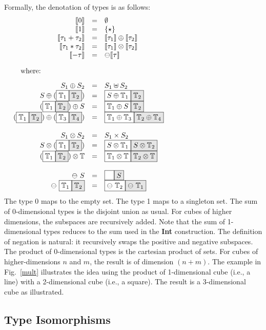 \documentclass[authoryear,preprint]{sigplanconf}
\newcommand{\cubt}{\mathbb{T}}
\newcommand{\den}[1]{\llbracket #1 \rrbracket}
\newcommand{\nodet}[2]{\fcolorbox{black}{white}{$#1$}\fcolorbox{black}{gray!20}{$#2$}}
\begin{document}
Formally, the denotation of types is as follows:
\[\begin{array}{rcl}
\den{0} &=& \emptyset \\
\den{1} &=& \{ \star \} \\
\den{\tau_1 + \tau_2} &=& \den{\tau_1} \oplus \den{\tau_2} \\
\den{\tau_1 * \tau_2} &=& \den{\tau_1} \otimes \den{\tau_2} \\
\den{- \tau} &=& \ominus \den{\tau} \\
\\
\noalign{\mbox{where:}\hfill}
\\
S_1 \oplus S_2 &=& S_1 \uplus S_2 \\
S \oplus (\nodet{\cubt_1}{\cubt_2}) &=& \nodet{S \oplus \cubt_1}{\cubt_2} \\
(\nodet{\cubt_1}{\cubt_2}) \oplus S &=& \nodet{\cubt_1 \oplus S}{\cubt_2} \\
(\nodet{\cubt_1}{\cubt_2}) \oplus (\nodet{\cubt_3}{\cubt_4}) &=& 
  \nodet{\cubt_1 \oplus \cubt_3}{\cubt_2 \oplus \cubt_4} \\
\\
S_1 \otimes S_2 &=& S_1 \times S_2 \\
S \otimes (\nodet{\cubt_1}{\cubt_2}) &=& 
  \nodet{S \otimes \cubt_1}{S \otimes \cubt_2} \\
(\nodet{\cubt_1}{\cubt_2}) \otimes \cubt &=& 
  \nodet{\cubt_1 \otimes \cubt}{\cubt_2 \otimes \cubt} \\
\\
\ominus~S &=& \nodet{\phantom{S}}{S} \\
\ominus~\nodet{\cubt_1}{\cubt_2} &=& \nodet{\ominus~\cubt_2}{\ominus~\cubt_1} 
\end{array}\]
The type 0 maps to the empty set. The type 1 maps to a singleton set. The sum
of $0$-dimensional types is the disjoint union as usual. For cubes of higher
dimensions, the subspaces are recursively added. Note that the sum of
1-dimensional types reduces to the sum used in the \textbf{Int} construction.
The definition of negation is natural: it recursively swaps the positive and
negative subspaces. The product of 0-dimensional types is the cartesian
product of sets. For cubes of higher-dimensions $n$ and $m$, the result is of
dimension $(n+m)$. The example in Fig.~\ref{mult} illustrates the idea using
the product of 1-dimensional cube (i.e., a line) with a 2-dimensional cube
(i.e., a square). The result is a 3-dimensional cube as illustrated.

\subsection{Type Isomorphisms}
\end{document}
